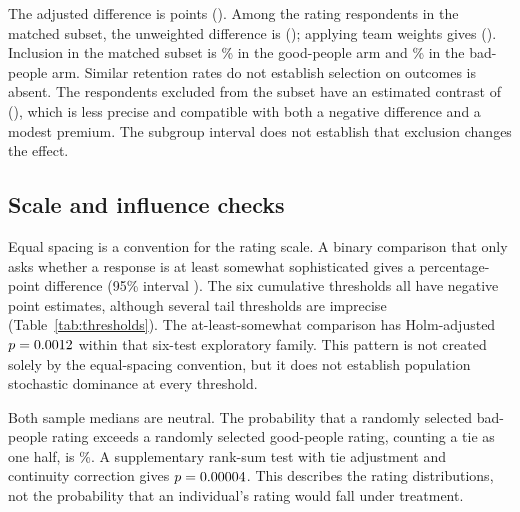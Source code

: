 \documentclass[11pt]{article}
\begin{document}
\begin{table}[htbp]
\centering

\caption{Bad-people minus good-people ratings, in 0--100 scale points.
Intervals use Welch inference except for covariate-adjusted and weighted
estimates, which use HC3 t inference. The rounded scale uses
0, 16, 33, 50, 66, 83, and 100. Sample restrictions and weighting change the
target population; the rows are not independent replications.}
\label{tab:estimates}
\end{table}

The adjusted difference is \AdjustedEstimate{} points (\AdjustedCI{}).
Among the \MatchedRatingN{} rating respondents in the matched subset, the
unweighted difference is \SubsetEstimate{} (\SubsetCI{}); applying team weights
gives \WeightedEstimate{} (\WeightedCI{}). Inclusion in the matched subset is
\GoodRetention{}\% in the good-people arm and \BadRetention{}\% in the
bad-people arm. Similar retention rates do not establish selection on outcomes
is absent. The \RemainderN{} respondents excluded from the subset have an
estimated contrast of \RemainderEstimate{} (\RemainderCI{}), which is less
precise and compatible with both a negative difference and a modest premium.
The subgroup interval does not establish that exclusion changes the effect.

\subsection{Scale and influence checks}

Equal spacing is a convention for the rating scale. A binary comparison that
only asks whether a response is at least somewhat sophisticated gives a
\BinaryEstimate{} percentage-point difference (95\% interval \BinaryCI{}).
The six cumulative thresholds all have negative point estimates, although
several tail thresholds are imprecise (Table~\ref{tab:thresholds}). The
at-least-somewhat comparison has Holm-adjusted $p=0.0012{}$ within that
six-test exploratory family. This pattern is not created solely by the
equal-spacing convention, but it does not establish population stochastic
dominance at every threshold.

Both sample medians are neutral. The probability that a randomly selected
bad-people rating exceeds a randomly selected good-people rating, counting a
tie as one half, is \RankProbability{}\%. A supplementary rank-sum test with
tie adjustment and continuity correction gives $p=0.00004{}$. This describes
the rating distributions, not the probability that an individual's rating
would fall under treatment.
\end{document}
